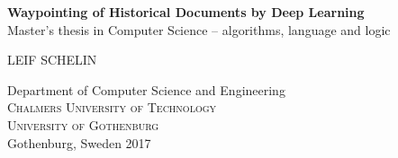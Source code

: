 
\begin{titlepage}
			
\addtolength{\voffset}{2cm}



\mbox{}
\vfill
\renewcommand{\familydefault}{\sfdefault} \normalfont %
\textbf{{\Huge 	Waypointing of Historical Documents by Deep Learning%
				}} 	\\[0.5cm]
Master's thesis in Computer Science -- algorithms, language and logic \setlength{\parskip}{1cm}

{\Large LEIF SCHELIN} \setlength{\parskip}{2.9cm}

Department of Computer Science and Engineering \\
\textsc{Chalmers University of Technology} \\
\textsc{University of Gothenburg} \\
Gothenburg, Sweden 2017

\renewcommand{\familydefault}{\rmdefault} \normalfont %
\end{titlepage}


\newpage
\restoregeometry
\thispagestyle{empty}
\mbox{}


